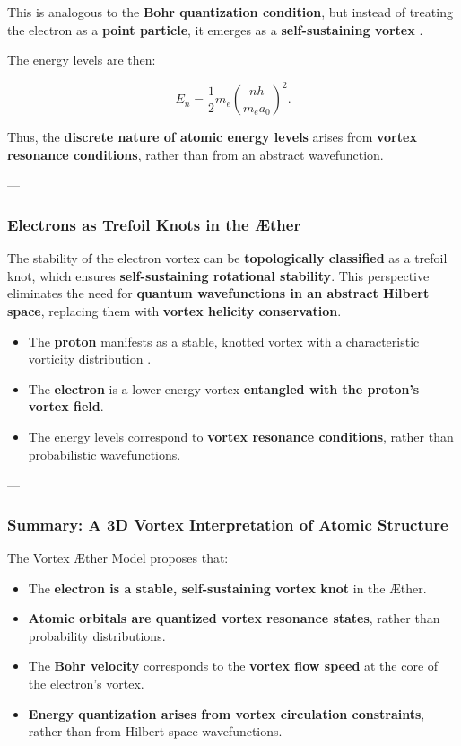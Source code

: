 \documentclass[a4paper,10pt]{article}
\begin{document}
This is analogous to the \textbf{Bohr quantization condition}, but instead of treating the electron as a \textbf{point particle}, it emerges as a \textbf{self-sustaining vortex} \cite{moffatt_helicity, knotted_vortices}.

The energy levels are then:

\begin{equation*}
    E_n = \frac{1}{2} m_e \left( \frac{n h}{m_e a_0} \right)^2.
\end{equation*}

Thus, the \textbf{discrete nature of atomic energy levels} arises from \textbf{vortex resonance conditions}, rather than from an abstract wavefunction.

---

\subsubsection*{Electrons as Trefoil Knots in the Æther}

The stability of the electron vortex can be \textbf{topologically classified} as a trefoil knot, which ensures \textbf{self-sustaining rotational stability}. This perspective eliminates the need for \textbf{quantum wavefunctions in an abstract Hilbert space}, replacing them with \textbf{vortex helicity conservation}.

\begin{itemize}
    \item The \textbf{proton} manifests as a stable, knotted vortex with a characteristic vorticity distribution \cite{thomson_knots}.
    \item The \textbf{electron} is a lower-energy vortex \textbf{entangled with the proton's vortex field}.
    \item The energy levels correspond to \textbf{vortex resonance conditions}, rather than probabilistic wavefunctions.
\end{itemize}

---

\subsubsection*{Summary: A 3D Vortex Interpretation of Atomic Structure}

The Vortex Æther Model proposes that:
\begin{itemize}
    \item The \textbf{electron is a stable, self-sustaining vortex knot} in the Æther.
    \item \textbf{Atomic orbitals are quantized vortex resonance states}, rather than probability distributions.
    \item The \textbf{Bohr velocity} corresponds to the \textbf{vortex flow speed} at the core of the electron's vortex.
    \item \textbf{Energy quantization arises from vortex circulation constraints}, rather than from Hilbert-space wavefunctions.
\end{itemize}
\end{document}
